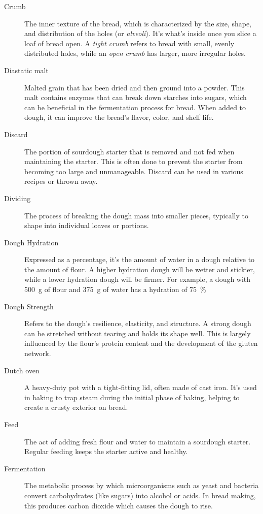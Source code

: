 \begin{description}
\item[Crumb] The inner texture of the bread, which is characterized by the size,
shape, and distribution of the holes (or \emph{alveoli}). It's what's inside once you slice
a loaf of bread open. A \emph{tight crumb} refers to bread with small, evenly distributed
holes, while an \emph{open crumb} has larger, more irregular holes.

\item[Diastatic malt] Malted grain that has been dried and then ground into a powder.
This malt contains enzymes that can break down starches into sugars, which can be
beneficial in the fermentation process for bread. When added to dough, it can improve
the bread's flavor, color, and shelf life.

\item[Discard] The portion of sourdough starter that is removed and not fed when
maintaining the starter. This is often done to prevent the starter from becoming too
large and unmanageable. Discard can be used in various recipes or thrown away.

\item[Dividing] The process of breaking the dough mass into smaller pieces,
typically to shape into individual loaves or portions.

\item[Dough Hydration] Expressed as a percentage, it's the amount of water in a
dough relative to the amount of flour. A higher hydration dough will be wetter and
stickier, while a lower hydration dough will be firmer. For example, a dough
with \SI{500}{\gram} of flour and \SI{375}{\gram} of water has a hydration of
\SI{75}{\percent}

\item[Dough Strength] Refers to the dough's resilience, elasticity, and structure.
A strong dough can be stretched without tearing and holds its shape well. This is
largely influenced by the flour's protein content and the development of the gluten
network.

\item[Dutch oven] A heavy-duty pot with a tight-fitting lid, often made of cast
iron. It's used in baking to trap steam during the initial phase of baking, helping
to create a crusty exterior on bread.

\item[Feed] The act of adding fresh flour and water to maintain a sourdough
starter. Regular feeding keeps the starter active and healthy.

\item[Fermentation] The metabolic process by which microorganisms such as yeast
and bacteria convert carbohydrates (like sugars) into alcohol or acids. In bread
making, this produces carbon dioxide which causes the dough to rise.


\end{description}
